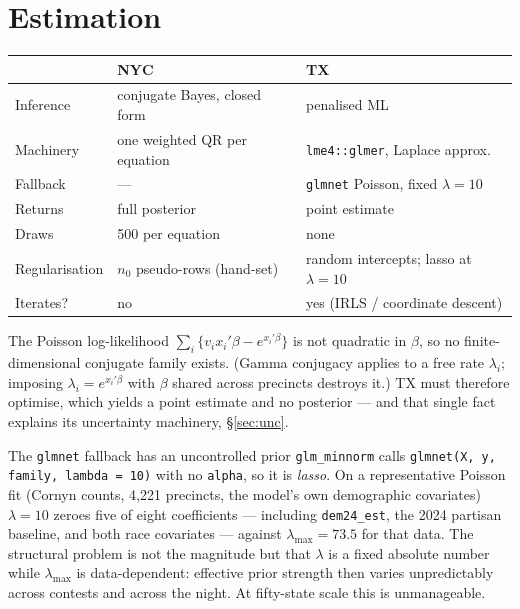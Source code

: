\documentclass[11pt]{article}
\begin{document}
\section{Estimation}\label{sec:est}

\begin{table}[ht]
\centering
\small
\begin{tabular}{@{}L{3.6cm}L{5.1cm}L{5.1cm}@{}}
\toprule
 & \textbf{NYC} & \textbf{TX} \\
\midrule
Inference & conjugate Bayes, closed form & penalised ML \\
Machinery & one weighted QR per equation & \texttt{lme4::glmer}, Laplace approx. \\
Fallback & --- & \texttt{glmnet} Poisson, fixed $\lambda = 10$ \\
Returns & full posterior & point estimate \\
Draws & 500 per equation & none \\
Regularisation & $n_0$ pseudo-rows (hand-set) & random intercepts; lasso at $\lambda=10$ \\
Iterates? & no & yes (IRLS / coordinate descent) \\
\bottomrule
\end{tabular}
\end{table}

\noindent The Poisson log-likelihood $\sum_i\{v_i x_i'\beta - e^{x_i'\beta}\}$ is not
quadratic in $\beta$, so no finite-dimensional conjugate family exists. (Gamma conjugacy
applies to a free rate $\lambda_i$; imposing $\lambda_i = e^{x_i'\beta}$ with $\beta$
shared across precincts destroys it.) TX must therefore optimise, which yields a point
estimate and no posterior --- and that single fact explains its uncertainty machinery,
\S\ref{sec:unc}.

\begin{memobox}{The \texttt{glmnet} fallback has an uncontrolled prior}
\texttt{glm\_minnorm} calls \texttt{glmnet(X, y, family, lambda = 10)} with no
\texttt{alpha}, so it is \emph{lasso}. On a representative Poisson fit (Cornyn counts,
4{,}221 precincts, the model's own demographic covariates) $\lambda = 10$ zeroes five of
eight coefficients --- including \texttt{dem24\_est}, the 2024 partisan baseline, and both
race covariates --- against $\lambda_{\max} = 73.5$ for that data. The structural problem
is not the magnitude but that $\lambda$ is a fixed absolute number while $\lambda_{\max}$
is data-dependent: effective prior strength then varies unpredictably across contests and
across the night. At fifty-state scale this is unmanageable.
\end{memobox}
\end{document}
